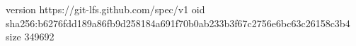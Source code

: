 version https://git-lfs.github.com/spec/v1
oid sha256:b6276fdd189a86fb9d258184a691f70b0ab233b3f67c2756e6bc63c26158c3b4
size 349692
